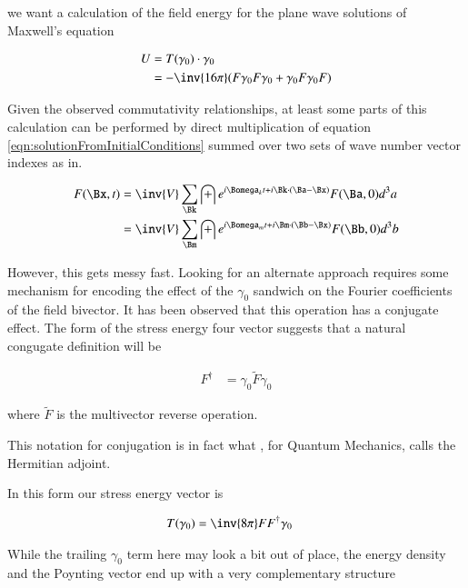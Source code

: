 \documentclass{article}
\begin{document}
we want a calculation of the field energy for the plane wave solutions of Maxwell's equation

\begin{align*}
U
&= T(\gamma_0) \cdot \gamma_0 \\
&= -\inv{16 \pi} ( F \gamma_0 F \gamma_0 + \gamma_0 F \gamma_0 F )
\end{align*}

Given the
observed commutativity relationships, at
least some parts of this calculation can be performed by direct multiplication of
equation \ref{eqn:solutionFromInitialConditions} summed over two sets of wave
number vector indexes as in.

\begin{align*}
F(\Bx,t)
&= \inv{V} \sum_{\Bk} \int e^{i \Bomega_k t + i \Bk \cdot (\Ba-\Bx) } F(\Ba, 0) d^3 a \\
&= \inv{V} \sum_{\Bm} \int e^{i \Bomega_m t + i \Bm \cdot (\Bb-\Bx) } F(\Bb, 0) d^3 b
\end{align*}

However, this gets messy fast.  Looking for an alternate approach requires some mechanism for encoding the effect
of the $\gamma_0$ sandwich on the Fourier coefficients of the field bivector.  It has been observed that this operation has a conjugate
effect.  The form of the stress energy four vector suggests that a natural congugate definition will be

\begin{align}
F^\dagger &= \gamma_0 \tilde{F} \gamma_0
\end{align}

where $\tilde{F}$ is the multivector reverse operation.

This notation for conjugation is in fact what 
, for Quantum Mechanics, \cite{doran2003gap} calls the Hermitian adjoint.

In this form our stress energy vector is

\begin{align}
T(\gamma_0) &= \inv{8 \pi} F F^\dagger \gamma_0
\end{align}

While the trailing $\gamma_0$ term here may look a bit out of place,
the energy density and the Poynting vector end up with a very complementary structure
\end{document}
